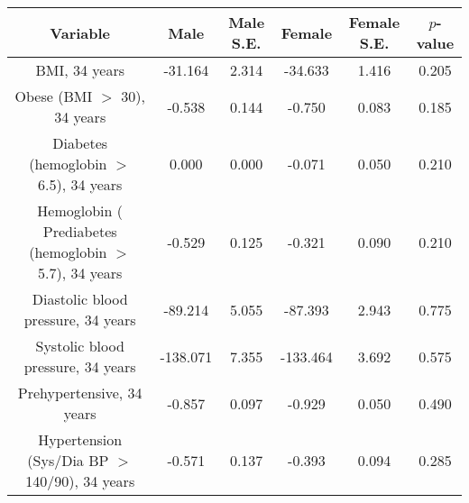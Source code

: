 \begin{longtable}{c c c c c c}
\toprule
\textbf{Variable} & \textbf{Male} & \textbf{Male S.E.}  & \textbf{Female} & \textbf{Female S.E.} & \textbf{$ p $-value} \\
\midrule
BMI, 34 years & -31.164 & 2.314 &  -34.633 & 1.416 & 0.205 \\
Obese (BMI $ > $ 30), 34 years & -0.538 & 0.144 &  -0.750 & 0.083 & 0.185 \\
Diabetes (hemoglobin $ > $ 6.5), 34 years & 0.000 & 0.000 &  -0.071 & 0.050 & 0.210 \\
Hemoglobin (%
Prediabetes (hemoglobin $ > $ 5.7), 34 years & -0.529 & 0.125 &  -0.321 & 0.090 & 0.210 \\
Diastolic blood pressure, 34 years & -89.214 & 5.055 &  -87.393 & 2.943 & 0.775 \\
Systolic blood pressure, 34 years & -138.071 & 7.355 &  -133.464 & 3.692 & 0.575 \\
Prehypertensive, 34 years & -0.857 & 0.097 &  -0.929 & 0.050 & 0.490 \\
Hypertension (Sys/Dia BP $ > $ 140/90), 34 years & -0.571 & 0.137 &  -0.393 & 0.094 & 0.285 \\
\bottomrule
\end{longtable}
